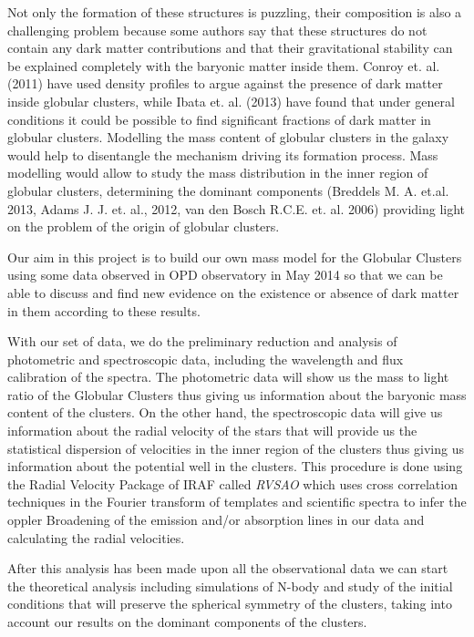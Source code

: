 Not only the formation of these structures is puzzling, their composition is also a challenging problem because some authors say that these structures do not contain any dark matter contributions and that their gravitational stability can be explained completely with the baryonic matter inside them. Conroy et. al. (2011) have used density profiles to argue against the presence of dark matter inside globular clusters, while Ibata et. al. (2013) have found that under general conditions it could be possible to find significant fractions of dark matter in globular clusters. Modelling the mass content of globular clusters in the galaxy would help to disentangle the mechanism driving its formation process. Mass modelling would allow to study the mass distribution in the inner region of globular clusters, determining the dominant components (Breddels M. A. et.al. 2013, Adams J. J. et. al., 2012, van den Bosch R.C.E. et. al. 2006) providing light on the problem of the origin of globular clusters.

Our aim in this project is to build our own mass model for the Globular Clusters using some data observed in OPD observatory in May 2014 so that we can be able to discuss and find new evidence on the existence or absence of dark matter in them according to these results. 

With our set of data, we do the preliminary reduction and analysis of photometric and spectroscopic data, including the wavelength and flux calibration of the spectra. The photometric data will show us the mass to light ratio of the Globular Clusters thus giving us information about the baryonic mass content of the clusters. On the other hand, the spectroscopic data will give us information about the radial velocity of the stars that will provide us the statistical dispersion of velocities in the inner region of the clusters thus giving us information about the potential well in the clusters. This procedure is done using the Radial Velocity Package of IRAF called \textit{RVSAO} which uses cross correlation techniques in the Fourier transform of templates and scientific spectra to infer the oppler Broadening of the emission and/or absorption lines in our data and calculating the radial velocities. 

After this analysis has been made upon all the observational data we can start the theoretical analysis including simulations of N-body and study of the initial conditions that will preserve the spherical symmetry of the clusters, taking into account our results on the dominant components of the clusters. 

